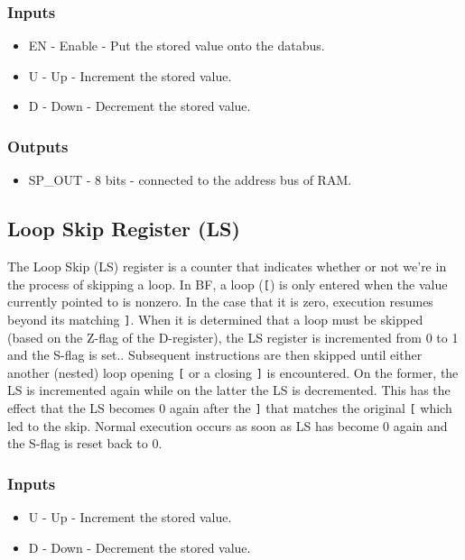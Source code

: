 \subsubsection*{Inputs}
\begin{itemize}
\itemsep0em 
\item EN - Enable - Put the stored value onto the databus.
\item U - Up - Increment the stored value.
\item D - Down - Decrement the stored value.
\end{itemize}

\subsubsection*{Outputs}
\begin{itemize}
\itemsep0em 
\item SP\_OUT - 8 bits - connected to the address bus of RAM.
\end{itemize}

\subsection{Loop Skip Register (LS)} \label{sec:architecture:ls}
The Loop Skip (LS) register is a counter that indicates whether or not we're in the process of skipping a loop. In BF, a loop (\texttt{[}) is only entered when the value currently pointed to is nonzero. In the case that it is zero, execution resumes beyond its matching \texttt{]}. When it is determined that a loop must be skipped (based on the Z-flag of the D-register), the LS register is incremented from 0 to 1 and the S-flag is set.. Subsequent instructions are then skipped until either another (nested) loop opening \texttt{[} or a closing \texttt{]} is encountered. On the former, the LS is incremented again while on the latter the LS is decremented. This has the effect that the LS becomes 0 again after the \texttt{]} that matches the original \texttt{[} which led to the skip. Normal execution occurs as soon as LS has become 0 again and the S-flag is reset back to 0.

\subsubsection*{Inputs}
\begin{itemize}
  \itemsep0em
\item U - Up - Increment the stored value.
\item D - Down - Decrement the stored value.
\end{itemize}

